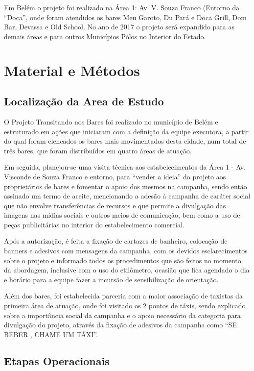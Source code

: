 \documentclass[output=paper,colorlinks,citecolor=green]{langscibook}
\begin{document}
Em Belém o projeto foi realizado na Área 1: Av. V. Souza Franco (Entorno da “Doca”, onde foram atendidos os bares Meu Garoto, Du Pará e Doca Grill, Dom Bar, Devassa e Old School. No ano de 2017 o projeto será expandido para as demais áreas e para outros Municípios Pólos no Interior do Estado.


\section{Material e Métodos}
\subsection{Localização da Area de Estudo}

O Projeto Transitando nos Bares foi realizado no município de Belém e estruturado em ações que iniciaram com a definição da equipe executora, a partir do qual foram elencados os bares mais movimentados desta cidade, num total de três bares, que foram distribuídos em quatro áreas de atuação. \vskip0.3cm


Em seguida, planejou-se uma visita técnica aos estabelecimentos da Área 1 - Av. Visconde de Souza Franco e entorno, para “vender a ideia” do projeto aos proprietários de bares e fomentar o apoio dos mesmos na campanha, sendo então assinado um termo de aceite, mencionando a adesão à campanha de caráter social que não envolve transferências de recursos e que permite a divulgação das imagens nas mídias sociais e outros meios de comunicação, bem como a uso de peças publicitárias no interior do estabelecimento comercial.\vskip0.3cm 

Após a autorização, é feita a fixação de cartazes de banheiro, colocação de banners e adesivos com mensagens da campanha, com os devidos esclarecimentos sobre o projeto e informado todos os procedimentos que são feitos no momento da abordagem, inclusive com o uso do etilômetro, ocasião que fica agendado o dia e horário para a equipe fazer a incursão de sensibilização de orientação.\vskip0.3cm 

Além dos bares, foi estabelecida parceria com a maior associação de taxistas da primeira área de atuação, onde foi visitado os 2 pontos de táxis, sendo explicado sobre a importância social da campanha e o apoio necessário da categoria para divulgação do projeto, através da fixação de adesivos da campanha como “SE BEBER , CHAME UM TÁXI”.\vskip0.3cm

\subsection{Etapas Operacionais}
\end{document}

